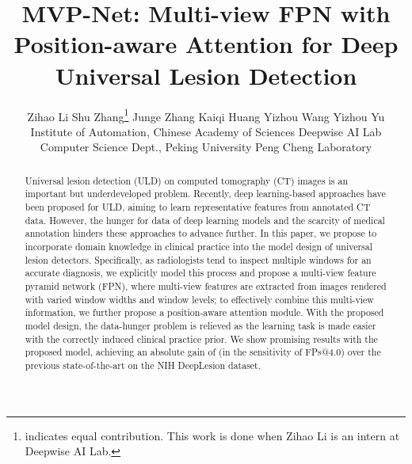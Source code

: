 \documentclass[runningheads]{llncs}
\begin{document}
\title{MVP-Net: Multi-view FPN with Position-aware Attention for Deep Universal Lesion Detection}
\author{Zihao Li 
\quad Shu Zhang\thanks{ indicates equal contribution. This work is done when Zihao Li is an intern at Deepwise AI Lab.}
\quad Junge Zhang
\quad Kaiqi Huang\quad \newline
Yizhou Wang\quad 
Yizhou Yu \newline
Institute of Automation, Chinese Academy of Sciences \quad Deepwise AI Lab\newline
\quad Computer Science Dept., Peking University \quad Peng Cheng Laboratory 
}
\institute{}

\maketitle


\begin{abstract}
Universal lesion detection (ULD) on computed tomography (CT) images is an important but underdeveloped problem. Recently, deep learning-based approaches have been proposed for ULD, aiming to learn representative features from annotated CT data. However, the hunger for data of deep learning models and the scarcity of medical annotation hinders these approaches to advance further. In this paper, we propose to incorporate domain knowledge in clinical practice into the model design of universal lesion detectors. Specifically, as radiologists tend to inspect multiple windows for an accurate diagnosis, we explicitly model this process and propose a multi-view feature pyramid network (FPN), where multi-view features are extracted from images rendered with varied window widths and window levels; to effectively combine this multi-view information, we further propose a position-aware attention module. With the proposed model design, the data-hunger problem is relieved as the learning task is made easier with the correctly induced clinical practice prior. We show promising results with the proposed model, achieving an absolute gain of  (in the sensitivity of FPs@4.0) over the previous state-of-the-art on the NIH DeepLesion dataset.\footnotemark[1]


\end{abstract}
\end{document}
